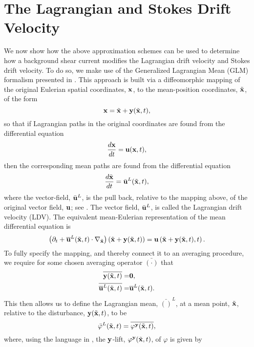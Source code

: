 \documentclass{JFM_Style/jfm}
\newcommand{\pd}{\partial}
\begin{document}
\section{The Lagrangian and Stokes Drift Velocity}
We now show how the above approximation schemes can be used to determine how a background shear current modifies the Lagrangian drift velocity  and Stokes drift velocity.  To do so, we make use of the Generalized Lagrangian Mean (GLM) formalism presented in \cite{andrews}.  This approach is built via a diffeomorphic mapping of the original Eulerian spatial coordinates, ${\bf x}$, to the mean-position coordinates, $\tilde{\bf x}$, of the form
\[
{\bf x} = \tilde{{\bf x}} + {\bf y}(\tilde{{\bf x}},t),
\]
so that if Lagrangian paths in the original coordinates are found from the differential equation
\[
\frac{d{\bf x}}{dt} = {\bf u}({\bf x},t),
\]
then the corresponding mean paths are found from the differential equation
\begin{equation}
\frac{d\tilde{{\bf x}}}{dt} = \bar{{\bf u}}^{L}(\tilde{{\bf x}},t),
\label{meanode}
\end{equation}
where the vector-field, $\bar{{\bf u}}^{L}$, is the pull back, relative to the mapping above, of the original vector field, ${\bf u}$; see \cite{buhler}.  The vector field, $\bar{{\bf u}}^{L}$, is called the Lagrangian drift velocity (LDV).  The equivalent mean-Eulerian representation of the mean differential equation is
\begin{equation}
\left(\pd_{t} + \overline{{\bf u}}^{L}(\tilde{{\bf x}},t)\cdot \nabla_{\tilde{{\bf x}}} \right) \left(\tilde{{\bf x}} + {\bf y}(\tilde{{\bf x}},t)\right) = {\bf u}\left(\tilde{{\bf x}} + {\bf y}(\tilde{{\bf x}},t),t\right).
\label{speeddef}
\end{equation}
To fully specify the mapping, and thereby connect it to an averaging procedure, we require for some chosen averaging operator $\bar{(\cdot)}$ that
\begin{align*}
\overline{{\bf y}(\tilde{{\bf x}},t)} = & \bf{0}, \\
\overline{\overline{{\bf u}}^{L}(\tilde{{\bf x}},t)} = & \overline{{\bf u}}^{L}(\tilde{{\bf x}},t).
\end{align*}
This then allows us to define the Lagrangian mean, $\bar{()}^{L}$, at a mean point, $\tilde{{\bf x}}$, relative to the disturbance, ${\bf y}(\tilde{{\bf x}},t)$, to be
\[
\bar{\varphi}^{L}(\tilde{{\bf x}},t) = \overline{\varphi^{\bf y}(\tilde{{\bf x}},t)},
\]
where, using the language in \cite{buhler}, the ${\bf y}$-lift, $\varphi^{\bf y}(\tilde{{\bf x}},t)$, of $\varphi$ is given by
\end{document}
